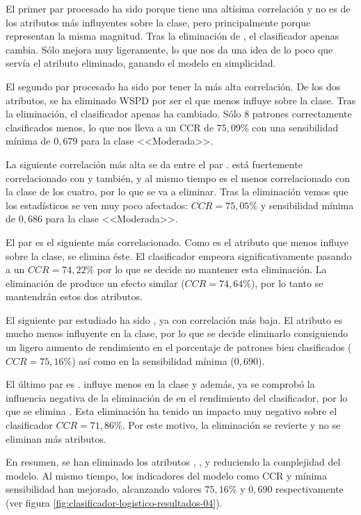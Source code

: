 El primer par procesado ha sido  porque tiene una altísima correlación y no es de los atributos más influyentes sobre la clase, pero principalmente porque representan la misma magnitud. Tras la eliminación de , el clasificador apenas cambia. Sólo mejora muy ligeramente, lo que nos da una idea de lo poco que servía el atributo eliminado, ganando el modelo en simplicidad.

El segundo par procesado ha sido  por tener la más alta correlación. De los dos atributos, se ha eliminado WSPD por ser el que menos influye sobre la clase. Tras la eliminación, el clasificador apenas ha cambiado. Sólo 8 patrones correctamente clasificados menos, lo que nos lleva a un CCR de $75,09\%$ con una sensibilidad mínima de $0,679$ para la clase <<Moderada>>.

La siguiente correlación más alta se da entre el par .  está fuertemente correlacionado con  y  también, y al mismo tiempo es el menos correlacionado con la clase de los cuatro, por lo que se va a eliminar. Tras la eliminación vemos que los estadísticos se ven muy poco afectados: $CCR=75,05\%$ y sensibilidad mínima de $0,686$ para la clase <<Moderada>>.

El par  es el siguiente más correlacionado. Como  es el atributo que menos influye sobre la clase, se elimina éste. El clasificador empeora significativamente pasando a un $CCR=74,22\%$ por lo que se decide no mantener esta eliminación. La eliminación de  produce un efecto similar ($CCR=74,64\%$), por lo tanto se mantendrán estos dos atributos.

El siguiente par estudiado ha sido , ya con correlación más baja. El atributo  es mucho menos influyente en la clase, por lo que se decide eliminarlo consiguiendo un ligero aumento de rendimiento en el porcentaje de patrones bien clasificados ($CCR=75,16\%$) así como en la sensibilidad mínima ($0,690$).

El último par es .  influye menos en la clase y además, ya se comprobó la influencia negativa de la eliminación de  en el rendimiento del clasificador, por lo que se elimina . Esta eliminación ha tenido un impacto muy negativo sobre el clasificador $CCR=71,86\%$. Por este motivo, la eliminación se revierte y no se eliminan más atributos.

En resumen, se han eliminado los atributos , ,  y  reduciendo la complejidad del modelo. Al mismo tiempo, los indicadores del modelo como CCR y mínima sensibilidad han mejorado, alcanzando valores $75,16\%$ y $0,690$ respectivamente (ver figura \ref{fig:clasificador-logistico-resultados-04}).

